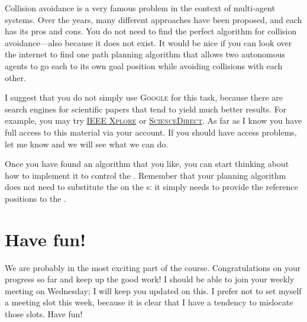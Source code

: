 Collision avoidance is a very famous problem in the context of multi-agent systems.
Over the years, many different approaches have been proposed, and each has its pros and cons.
You do not need to find the perfect algorithm for collision avoidance---also because it does not exist.
It would be nice if you can look over the internet to find one path planning algorithm that allows two autonomous agents to go each to its own goal position while avoiding collisions with each other.

I suggest that you do not simply use \textsc{Google} for this task, because there are search engines for scientific papers that tend to yield much better results.
For example, you may try \href{http://ieeexplore.ieee.org/Xplore/home.jsp}{\textsc{IEEE Xplore}} or \href{http://www.sciencedirect.com/science/journals/all}{\textsc{ScienceDirect}}.
As far as I know you have full access to this material via your \KTH{} account.
If you should have access problems, let me know and we will see what we can do.

Once you have found an algorithm that you like, you can start thinking about how to implement it to control the \CF{}.
Remember that your planning algorithm does not need to substitute the \PID{} on the \CF{}s: it simply needs to provide the reference positions to the \PID{}.




\section*{Have fun!}

We are probably in the most exciting part of the course.
Congratulations on your progress so far and keep up the good work!
I should be able to join your weekly meeting on Wednesday; I will keep you updated on this.
I prefer not to set myself a meeting slot this week, because it is clear that I have a tendency to mislocate those slots.
Have fun!
